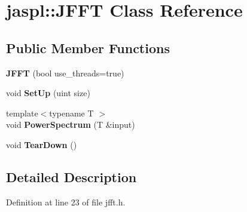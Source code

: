 \hypertarget{classjaspl_1_1_j_f_f_t}{}\section{jaspl\+:\+:J\+F\+FT Class Reference}
\label{classjaspl_1_1_j_f_f_t}
\subsection*{Public Member Functions}
\begin{DoxyCompactItemize}
\item 
{\bfseries J\+F\+FT} (bool use\+\_\+threads=true)\hypertarget{classjaspl_1_1_j_f_f_t_a49ff533f05591cb00b4a10375165fbac}{}\label{classjaspl_1_1_j_f_f_t_a49ff533f05591cb00b4a10375165fbac}

\item 
void {\bfseries Set\+Up} (uint size)\hypertarget{classjaspl_1_1_j_f_f_t_a84550e2cbeca2b2cb09a15308ccdf055}{}\label{classjaspl_1_1_j_f_f_t_a84550e2cbeca2b2cb09a15308ccdf055}

\item 
{\footnotesize template$<$typename T $>$ }\\void {\bfseries Power\+Spectrum} (T \&input)\hypertarget{classjaspl_1_1_j_f_f_t_a3953d73759cf17cb93f2b1e76691a8fe}{}\label{classjaspl_1_1_j_f_f_t_a3953d73759cf17cb93f2b1e76691a8fe}

\item 
void {\bfseries Tear\+Down} ()\hypertarget{classjaspl_1_1_j_f_f_t_a7ba090708a0e3b6e1dba81574fa52548}{}\label{classjaspl_1_1_j_f_f_t_a7ba090708a0e3b6e1dba81574fa52548}

\end{DoxyCompactItemize}


\subsection{Detailed Description}


Definition at line 23 of file jfft.\+h.

